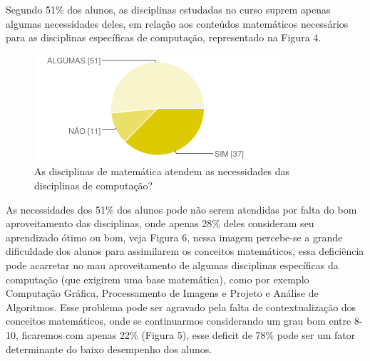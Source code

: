 \documentclass[12pt,a4paper]{article}
\begin{document}
Segundo 51\% dos alunos, as disciplinas estudadas no curso suprem apenas algumas necessidades deles, em relação aos conteúdos matemáticos necessários para as disciplinas específicas de computação, representado na Figura 4. 

\begin{figure}[!h]
\centering
\includegraphics[scale=0.7]{imagens/fig4.png} 
\caption{As disciplinas de matemática atendem as necessidades das disciplinas de computação?}
\end{figure}

As necessidades dos 51\% dos alunos pode não serem atendidas por falta do bom aproveitamento das disciplinas, onde apenas 28\% deles consideram seu aprendizado ótimo ou bom, veja Figura 6, nessa imagem percebe-se a grande dificuldade dos alunos para assimilarem os conceitos matemáticos, essa deficiência pode acarretar no mau aproveitamento de algumas disciplinas específicas da computação (que exigirem uma base matemática), como por exemplo Computação Gráfica, Processamento de Imagens e Projeto e Análise de Algoritmos. Esse problema pode ser agravado pela falta de contextualização dos conceitos matemáticos, onde se continuarmos considerando um grau bom entre 8-10, ficaremos com apenas 22\% (Figura 5), esse deficit de 78\% pode ser um fator determinante do baixo desempenho dos alunos. 
\end{document}
